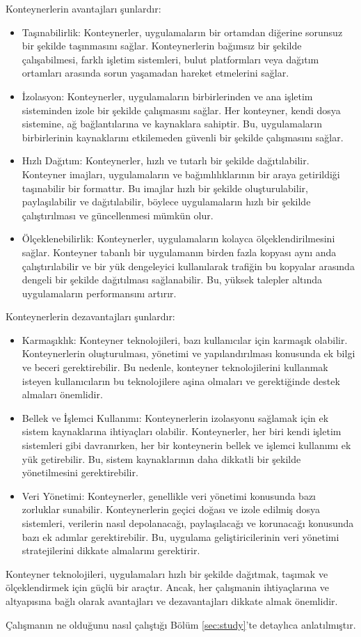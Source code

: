 Konteynerlerin avantajları şunlardır:
\begin{itemize}
  \item Taşınabilirlik: Konteynerler, uygulamaların bir ortamdan diğerine sorunsuz bir şekilde taşınmasını sağlar. Konteynerlerin bağımsız bir şekilde çalışabilmesi, farklı işletim sistemleri, bulut platformları veya dağıtım ortamları arasında sorun yaşamadan hareket etmelerini sağlar.
  \item İzolasyon: Konteynerler, uygulamaların birbirlerinden ve ana işletim sisteminden izole bir şekilde çalışmasını sağlar. Her konteyner, kendi dosya sistemine, ağ bağlantılarına ve kaynaklara sahiptir. Bu, uygulamaların birbirlerinin kaynaklarını etkilemeden güvenli bir şekilde çalışmasını sağlar.
  \item Hızlı Dağıtım: Konteynerler, hızlı ve tutarlı bir şekilde dağıtılabilir. Konteyner imajları, uygulamaların ve bağımlılıklarının bir araya getirildiği taşınabilir bir formattır. Bu imajlar hızlı bir şekilde oluşturulabilir, paylaşılabilir ve dağıtılabilir, böylece uygulamaların hızlı bir şekilde çalıştırılması ve güncellenmesi mümkün olur.
  \item Ölçeklenebilirlik: Konteynerler, uygulamaların kolayca ölçeklendirilmesini sağlar. Konteyner tabanlı bir uygulamanın birden fazla kopyası aynı anda çalıştırılabilir ve bir yük dengeleyici kullanılarak trafiğin bu kopyalar arasında dengeli bir şekilde dağıtılması sağlanabilir. Bu, yüksek talepler altında uygulamaların performansını artırır.
\end{itemize}

Konteynerlerin dezavantajları şunlardır:
\begin{itemize}
  \item Karmaşıklık: Konteyner teknolojileri, bazı kullanıcılar için karmaşık olabilir. Konteynerlerin oluşturulması, yönetimi ve yapılandırılması konusunda ek bilgi ve beceri gerektirebilir. Bu nedenle, konteyner teknolojilerini kullanmak isteyen kullanıcıların bu teknolojilere aşina olmaları ve gerektiğinde destek almaları önemlidir.
  \item Bellek ve İşlemci Kullanımı: Konteynerlerin izolasyonu sağlamak için ek sistem kaynaklarına ihtiyaçları olabilir. Konteynerler, her biri kendi işletim sistemleri gibi davranırken, her bir konteynerin bellek ve işlemci kullanımı ek yük getirebilir. Bu, sistem kaynaklarının daha dikkatli bir şekilde yönetilmesini gerektirebilir.
  \item Veri Yönetimi: Konteynerler, genellikle veri yönetimi konusunda bazı zorluklar sunabilir. Konteynerlerin geçici doğası ve izole edilmiş dosya sistemleri, verilerin nasıl depolanacağı, paylaşılacağı ve korunacağı konusunda bazı ek adımlar gerektirebilir. Bu, uygulama geliştiricilerinin veri yönetimi stratejilerini dikkate almalarını gerektirir.
\end{itemize}

Konteyner teknolojileri, uygulamaları hızlı bir şekilde dağıtmak, taşımak ve ölçeklendirmek için güçlü bir araçtır. Ancak, her çalışmanin ihtiyaçlarına ve altyapısına bağlı olarak avantajları ve dezavantajları dikkate almak önemlidir.

Çalışmanın ne olduğunu nasıl çalıştığı Bölüm \ref{sec:study}'te detaylıca anlatılmıştır.